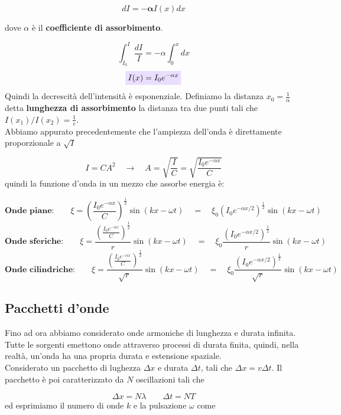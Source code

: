 \documentclass[x11names]{article}
\newcommand{\viola}[1]{\colorbox{myred}{$\displaystyle #1$}}
\begin{document}
	\[ 
 	dI = -\boldsymbol{\alpha} I(x)dx
	\]
	
	dove \(\alpha\) è il \textbf{coefficiente di assorbimento}.
	
	\[ 
	\int_{I_0}^{I} \frac{dI}{I} = -\alpha\int_{0}^{x} dx 
	\]
	\begin{equation}
 		\viola{I(x) = I_0e^{-\alpha x}}
	\end{equation}
	Quindi la decrescità dell'intensità è esponenziale. Definiamo la distanza \(x_0 = \frac{1}{\alpha}\) detta \textbf{lunghezza di assorbimento} la distanza tra due punti tali che \(I(x_1)/I(x_2) = \frac{1}{e}\).\\
	
	\noindent
	Abbiamo appurato precedentemente che l'ampiezza dell'onda è direttamente proporzionale a \(\sqrt{I}\)
	
	\[ 
	I = CA^2 \quad \to \quad A = \sqrt{\frac{I}{C}} = \sqrt{\frac{I_0e^{-\alpha x}}{C}}
	\]
	quindi la funzione d'onda in un mezzo che assorbe energia è:
	
	\[ 
	\textbf{Onde piane:}\qquad \xi = \left(\frac{I_0e^{-\alpha x}}{C}\right)^{\frac{1}{2}} \sin\left(kx-\omega t\right) \quad = \quad \xi_0 \left(I_0e^{-\alpha x/2}\right)^{\frac{1}{2}}\sin\left(kx-\omega t\right)
	\]
	\[ 
	\textbf{Onde sferiche:}\qquad \xi = \frac{\left(\frac{I_0e^{-\alpha x}}{C}\right)^{\frac{1}{2}}}{r} \sin\left(kx-\omega t\right) \quad = \quad \xi_0 \frac{\left(I_0e^{-\alpha x/2}\right)^{\frac{1}{2}}}{r}\sin\left(kx-\omega t\right)
	\]
	\[ 
	\textbf{Onde cilindriche:}\qquad \xi = \frac{\left(\frac{I_0e^{-\alpha x}}{C}\right)^{\frac{1}{2}}}{\sqrt{r}} \sin\left(kx-\omega t\right) \quad = \quad \xi_0 \frac{\left(I_0e^{-\alpha x/2}\right)^{\frac{1}{2}}}{\sqrt{r}}\sin\left(kx-\omega t\right)
	\]
	
	\newpage
	\subsection{Pacchetti d'onde}
	Fino ad ora abbiamo considerato onde armoniche di lunghezza e durata infinita. Tutte le sorgenti emettono onde attraverso processi di durata finita, quindi, nella realtà, un'onda ha una propria durata e estensione spaziale.\\
	
	\noindent
	Considerato un pacchetto di lughezza \(\Delta x\) e durata \(\Delta t\), tali che \(\Delta x = v\Delta t\). Il pacchetto è poi caratterizzato da \(N\) oscillazioni tali che
	
	\[ 
\Delta x  =N \lambda \qquad \Delta t = NT 
	\]
	ed esprimiamo il numero di onde \(k\) e la pulsazione \(\omega\) come
	
\end{document}
